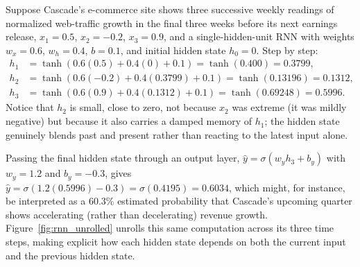 \documentclass[../ai_in_finance]{subfiles}
\begin{document}
Suppose Cascade's e-commerce site shows three successive weekly readings of normalized web-traffic growth in the final three weeks before its next earnings release, $x_1 = 0.5$, $x_2 = -0.2$, $x_3 = 0.9$, and a single-hidden-unit RNN with weights $w_x = 0.6$, $w_h = 0.4$, $b = 0.1$, and initial hidden state $h_0 = 0$. Step by step:
\begin{align*}
h_1 &= \tanh(0.6(0.5) + 0.4(0) + 0.1) = \tanh(0.400) = 0.3799, \\
h_2 &= \tanh(0.6(-0.2) + 0.4(0.3799) + 0.1) = \tanh(0.13196) = 0.1312, \\
h_3 &= \tanh(0.6(0.9) + 0.4(0.1312) + 0.1) = \tanh(0.69248) = 0.5996.
\end{align*}
Notice that $h_2$ is small, close to zero, not because $x_2$ was extreme (it was mildly negative) but because it also carries a damped memory of $h_1$; the hidden state genuinely blends past and present rather than reacting to the latest input alone.

Passing the final hidden state through an output layer, $\hat y = \sigma(w_y h_3 + b_y)$ with $w_y = 1.2$ and $b_y = -0.3$, gives $\hat y = \sigma(1.2(0.5996) - 0.3) = \sigma(0.4195) = 0.6034$, which might, for instance, be interpreted as a 60.3\% estimated probability that Cascade's upcoming quarter shows accelerating (rather than decelerating) revenue growth. Figure~\ref{fig:rnn_unrolled} unrolls this same computation across its three time steps, making explicit how each hidden state depends on both the current input and the previous hidden state.
\end{document}
